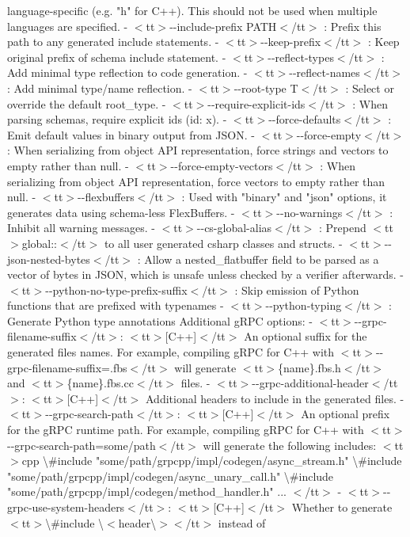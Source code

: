 \begin{DoxyItemize}
language-\/specific (e.\+g. "{}h"{} for C++). This     should not be used when multiple languages are specified.  -\/   $<$tt$>$-\/-\/include-\/prefix PATH$<$/tt$>$ \+: Prefix this path to any generated include     statements.  -\/   $<$tt$>$-\/-\/keep-\/prefix$<$/tt$>$ \+: Keep original prefix of schema include statement.  -\/   $<$tt$>$-\/-\/reflect-\/types$<$/tt$>$ \+: Add minimal type reflection to code generation.  -\/   $<$tt$>$-\/-\/reflect-\/names$<$/tt$>$ \+: Add minimal type/name reflection.  -\/   $<$tt$>$-\/-\/root-\/type T$<$/tt$>$ \+: Select or override the default root\+\_\+type.  -\/   $<$tt$>$-\/-\/require-\/explicit-\/ids$<$/tt$>$ \+: When parsing schemas, require explicit ids (id\+: x).  -\/   $<$tt$>$-\/-\/force-\/defaults$<$/tt$>$ \+: Emit default values in binary output from JSON.  -\/   $<$tt$>$-\/-\/force-\/empty$<$/tt$>$ \+: When serializing from object API representation, force      strings and vectors to empty rather than null.  -\/   $<$tt$>$-\/-\/force-\/empty-\/vectors$<$/tt$>$ \+: When serializing from object API representation, force      vectors to empty rather than null.  -\/   $<$tt$>$-\/-\/flexbuffers$<$/tt$>$ \+: Used with "{}binary"{} and "{}json"{} options, it generates      data using schema-\/less Flex\+Buffers.  -\/   $<$tt$>$-\/-\/no-\/warnings$<$/tt$>$ \+: Inhibit all warning messages.  -\/   $<$tt$>$-\/-\/cs-\/global-\/alias$<$/tt$>$ \+: Prepend $<$tt$>$global\+::$<$/tt$>$ to all user generated csharp classes and structs.  -\/   $<$tt$>$-\/-\/json-\/nested-\/bytes$<$/tt$>$ \+: Allow a nested\+\_\+flatbuffer field to be parsed as a     vector of bytes in JSON, which is unsafe unless checked by a verifier     afterwards.  -\/   $<$tt$>$-\/-\/python-\/no-\/type-\/prefix-\/suffix$<$/tt$>$ \+: Skip emission of Python functions that are prefixed     with typenames  -\/   $<$tt$>$-\/-\/python-\/typing$<$/tt$>$ \+: Generate Python type annotations  \+Additional g\+RPC options\+:  -\/   $<$tt$>$-\/-\/grpc-\/filename-\/suffix$<$/tt$>$\+: $<$tt$>$\mbox{[}\+C++\mbox{]}$<$/tt$>$ An optional suffix for the generated     files\textquotesingle{} names. For example, compiling g\+RPC for C++ with     $<$tt$>$-\/-\/grpc-\/filename-\/suffix=.\+fbs$<$/tt$>$ will generate $<$tt$>$\{name\}.\+fbs.\+h$<$/tt$>$ and     $<$tt$>$\{name\}.\+fbs.\+cc$<$/tt$>$ files.  -\/   $<$tt$>$-\/-\/grpc-\/additional-\/header$<$/tt$>$\+: $<$tt$>$\mbox{[}\+C++\mbox{]}$<$/tt$>$ Additional headers to include in the     generated files.  -\/   $<$tt$>$-\/-\/grpc-\/search-\/path$<$/tt$>$\+: $<$tt$>$\mbox{[}\+C++\mbox{]}$<$/tt$>$ An optional prefix for the g\+RPC runtime path.     For example, compiling g\+RPC for C++ with $<$tt$>$-\/-\/grpc-\/search-\/path=some/path$<$/tt$>$ will     generate the following includes\+:      $<$tt$>$cpp       \textbackslash{}\#include "{}some/path/grpcpp/impl/codegen/async\+\_\+stream.\+h"{}       \textbackslash{}\#include "{}some/path/grpcpp/impl/codegen/async\+\_\+unary\+\_\+call.\+h"{}       \textbackslash{}\#include "{}some/path/grpcpp/impl/codegen/method\+\_\+handler.\+h"{}       ... $<$/tt$>$  -\/   $<$tt$>$-\/-\/grpc-\/use-\/system-\/headers$<$/tt$>$\+: $<$tt$>$\mbox{[}\+C++\mbox{]}$<$/tt$>$ Whether to generate $<$tt$>$\textbackslash{}\#include \textbackslash{}$<$header\textbackslash{}$>$$<$/tt$>$     instead of 
\end{DoxyItemize}
